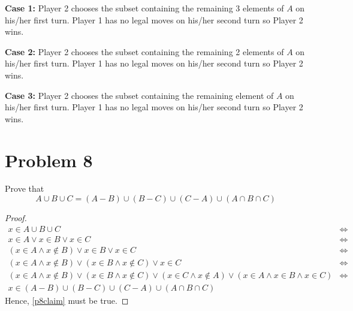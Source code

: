 \documentclass{article}
\begin{document}
\textbf{Case 1:}
Player 2 chooses the subset containing the remaining 3 elements of $A$ on his/her first turn. Player 1 has no legal moves on his/her second turn so Player 2 wins.

\textbf{Case 2:}
Player 2 chooses the subset containing the remaining 2 elements of $A$ on his/her first turn. Player 1 has no legal moves on his/her second turn so Player 2 wins.

\textbf{Case 3:}
Player 2 chooses the subset containing the remaining element of $A$ on his/her first turn. Player 1 has no legal moves on his/her second turn so Player 2 wins.

\pagebreak

\section{Problem 8}
Prove that
\begin{equation}\label{p8claim}
	A \cup B \cup C = (A - B) \cup (B - C) \cup (C - A) \cup (A \cap B \cap C)
\end{equation}
\begin{proof}
	\begin{align*}
		x \in A \cup B \cup C                                                                                                                 & \iff \\
		x \in A \lor x \in B \lor x \in C                                                                                                     & \iff \\
		(x \in A \land x \notin B) \lor x \in B \lor x \in C                                                                                  & \iff \\
		(x \in A \land x \notin B) \lor (x \in B \land x \notin C) \lor x \in C                                                               & \iff \\
		(x \in A \land x \notin B) \lor (x \in B \land x \notin C) \lor (x \in C \land x \notin A) \lor (x \in A \land x \in B \land x \in C) & \iff \\
		x \in (A - B) \cup (B - C) \cup (C - A) \cup (A \cap B \cap C)                                                                        &
	\end{align*}
	Hence, \eqref{p8claim} must be true.
\end{proof}

\pagebreak
\end{document}
